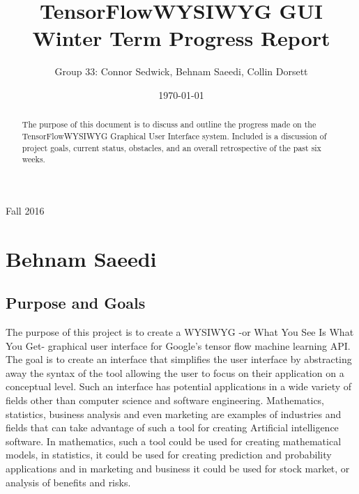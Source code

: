 \documentclass[journal,10pt,onecolumn,compsoc]{IEEEtran} \usepackage[margin=1.0in]{geometry} \usepackage{pdfpages}
\title{TensorFlow\texttrademark WYSIWYG GUI Winter Term Progress Report}
\author{Group 33: Connor Sedwick, Behnam Saeedi, Collin Dorsett}
\date{\today}
\begin{document}
\maketitle
\begin{centering}
Fall 2016
\begin{abstract}
The purpose of this document is to discuss and outline the progress made on the  TensorFlow\texttrademark WYSIWYG Graphical User Interface system. 
Included is a discussion of project goals, current status, obstacles, and an overall retrospective of the past six weeks.
\end{abstract}
\end{centering}
\newpage
\tableofcontents
\newpage
\section{Behnam Saeedi}
\subsection{Purpose and Goals}
\noindent The purpose of this project is to create a WYSIWYG -or What You See Is What You Get- graphical user interface for Google’s tensor flow machine learning API.
The goal is to create an interface that simplifies the user interface by abstracting away the syntax of the tool allowing the user to focus on their application on a conceptual level.
Such an interface has potential applications in a wide variety of fields other than computer science and software engineering.
Mathematics, statistics, business analysis and even marketing are examples of industries and fields that can take advantage of such a tool for creating Artificial intelligence software.
In mathematics, such a tool could be used for creating mathematical models, in statistics, it could be used for creating prediction and probability applications and in marketing and business it could be used for stock market, or analysis of benefits and risks.
\end{document}
